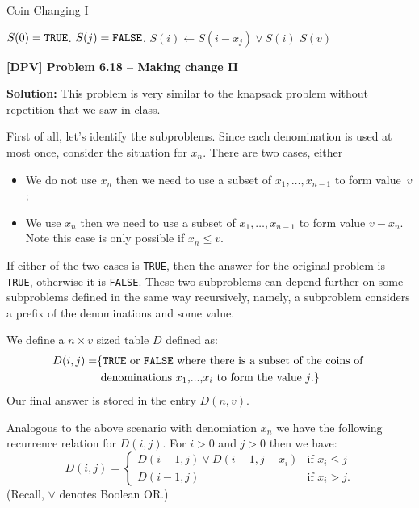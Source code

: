 \documentclass[12pt]{article}
\begin{document}
\begin{algorithm}[h!]
\caption{Coin Changing I} 
\begin{algorithmic}
\STATE $S(0) = {\tt TRUE}$.
\STATE $S(j) = {\tt FALSE}$.
\ENDFOR
{}
\STATE $S(i) \leftarrow S(i-x_j) \vee S(i)$
\ENDIF
\ENDFOR
\ENDFOR
\RETURN $S(v)$
\end{algorithmic}
\end{algorithm}

\newpage

{\noindent \bf [DPV] Problem 6.18 -- Making change II}

{\noindent \bf Solution:}
This problem is very similar to the knapsack problem without
repetition that we saw in class.

First of all, let's identify the subproblems.
Since each denomination is used at most once, consider the situation
for $x_n$.
There are two cases, either
\begin{itemize}
\item We do not use $x_n$ then we need to use
a subset of $x_1,\dots,x_{n-1}$ to form value~$v$;
\item We use $x_n$ then we need to use
a subset of $x_1,\dots,x_{n-1}$ to form value $v-x_n$.
Note this case is only possible if $x_n \leq v$.
\end{itemize}
If either of the two cases is {\tt TRUE}, then the answer for the original problem is {\tt TRUE}, otherwise it is {\tt FALSE}. These two subproblems can depend further on
some subproblems defined in the same way recursively, namely,
 a subproblem considers a prefix of the denominations and some value.

We define a $n\times v$ sized table $D$ defined as:
\begin{eqnarray*}
D(i,j) = & \{\mbox{{\tt TRUE} or {\tt FALSE} where 
there is a subset of the
coins of } \\
& \mbox{ denominations $x_1$,...,$x_i$ to form the value $j$.} \}
\end{eqnarray*}
Our final answer is stored in the entry $D(n,v)$.

Analogous to the above scenario with denomiation $x_n$ we have the
following recurrence relation for $D(i,j)$.
For $i>0$ and $j>0$ then we have:
\[
D(i,j) =
\begin{cases}
D(i-1,j) \vee D(i-1,j-x_i) & \mbox{if } x_i\le j \\
D(i-1,j) & \mbox{if } x_i>j.
\end{cases}
\]
 (Recall, $\vee$ denotes Boolean OR.)
\end{document}
